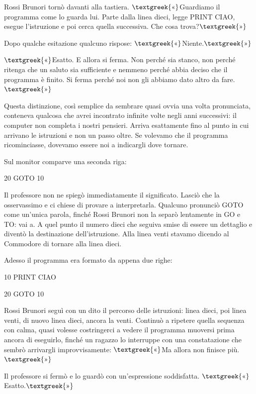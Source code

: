 \documentclass{article}
\begin{document}
Rossi Brunori tornò davanti alla tastiera. $\text{\textgreek{«}}$Guardiamo il programma come lo guarda lui. Parte dalla
linea dieci, legge PRINT {\textquotedbl}CIAO{\textquotedbl}, esegue l'istruzione e poi cerca quella successiva. Che
cosa trova?$\text{\textgreek{»}}$

Dopo qualche esitazione qualcuno rispose: $\text{\textgreek{«}}$Niente.$\text{\textgreek{»}}$

$\text{\textgreek{«}}$Esatto. E allora si ferma. Non perché sia stanco, non perché ritenga che un saluto sia sufficiente
e nemmeno perché abbia deciso che il programma è finito. Si ferma perché noi non gli abbiamo dato altro da
fare.$\text{\textgreek{»}}$

Questa distinzione, così semplice da sembrare quasi ovvia una volta pronunciata, conteneva qualcosa che avrei incontrato
infinite volte negli anni successivi: il computer non completa i nostri pensieri. Arriva esattamente fino al punto in
cui arrivano le istruzioni e non un passo oltre. Se volevamo che il programma ricominciasse, dovevamo essere noi a
indicargli dove tornare.

Sul monitor comparve una seconda riga:

20 GOTO 10

Il professore non ne spiegò immediatamente il significato. Lasciò che la osservassimo e ci chiese di provare a
interpretarla. Qualcuno pronunciò GOTO come un'unica parola, finché Rossi Brunori non la separò lentamente in GO e TO:
vai a. A quel punto il numero dieci che seguiva smise di essere un dettaglio e diventò la destinazione dell'istruzione.
Alla linea venti stavamo dicendo al Commodore di tornare alla linea dieci.

Adesso il programma era formato da appena due righe:

10 PRINT {\textquotedbl}CIAO{\textquotedbl}

20 GOTO 10

Rossi Brunori seguì con un dito il percorso delle istruzioni: linea dieci, poi linea venti, di nuovo linea dieci, ancora
la venti. Continuò a ripetere quella sequenza con calma, quasi volesse costringerci a vedere il programma muoversi
prima ancora di eseguirlo, finché un ragazzo lo interruppe con una constatazione che sembrò arrivargli improvvisamente:
$\text{\textgreek{«}}$Ma allora non finisce più.$\text{\textgreek{»}}$

Il professore si fermò e lo guardò con un'espressione soddisfatta. $\text{\textgreek{«}}$Esatto.$\text{\textgreek{»}}$
\end{document}
